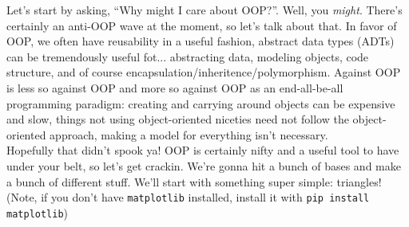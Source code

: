 \documentclass[12pt]{article}
\begin{document}
Let's start by asking, ``Why might I care about OOP?''. Well, you \textit{might}. There's certainly an anti-OOP wave at the moment, so let's talk about that. In favor of OOP, we often have reusability in a useful fashion, abstract data types (ADTs) can be tremendously useful fot... abstracting data, modeling objects, code structure, and of course encapsulation/inheritence/polymorphism. Against OOP is less so against OOP and more so against OOP as an end-all-be-all programming paradigm: creating and carrying around objects can be expensive and slow, things not using object-oriented niceties need not follow the object-oriented approach, making a model for everything isn't necessary.\\
Hopefully that didn't spook ya! OOP is certainly nifty and a useful tool to have under your belt, so let's get crackin. We're gonna hit a bunch of bases and make a bunch of different stuff. We'll start with something super simple: triangles! (Note, if you don't have \texttt{matplotlib} installed, install it with \texttt{pip install matplotlib})\\

\\
\end{document}
